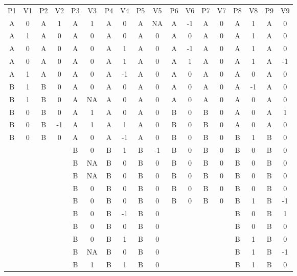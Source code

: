 \documentclass{article}
\begin{document}
\begin{table}

  
\begin{tabular}{c  c  c  c  c  c  c  c  c  c  c  c  c  c  c  c  c  c}

  P1 & V1 & P2 & V2 & P3 & V3 & P4 & V4 & P5 & V5 & P6 & V6 & P7 & V7 & P8 & V8 & P9 & V9\\
A & 0 & A & 1 & A & 1 & A & 0 & A & NA & A & -1 & A & 0 & A & 1 & A & 0\\
A & 1 & A & 0 & A & 0 & A & 0 & A & 0 & A & 0 & A & 0 & A & 1 & A & 0\\
A & 0 & A & 0 & A & 0 & A & 1 & A & 0 & A & -1 & A & 0 & A & 1 & A & 0\\
A & 0 & A & 0 & A & 0 & A & 1 & A & 0 & A & 1 & A & 0 & A & 1 & A & -1\\
A & 1 & A & 0 & A & 0 & A & -1 & A & 0 & A & 0 & A & 0 & A & 0 & A & 0\\
B & 1 & B & 0 & A & 0 & A & 0 & A & 0 & A & 0 & A & 0 & A & -1 & A & 0\\
B & 1 & B & 0 & A & NA & A & 0 & A & 0 & A & 0 & A & 0 & A & 0 & A & 0\\
B & 0 & B & 0 & A & 1 & A & 0 & A & 0 & B & 0 & B & 0 & A & 0 & A & 1\\
B & 0 & B & -1 & A & 1 & A & 1 & A & 0 & B & 0 & B & 0 & A & 0 & A & 0\\
B & 0 & B & 0 & A & 0 & A & -1 & A & 0 & B & 0 & B & 0 & B & 1 & B & 0\\
  &   &   &   & B & 0 & B & 1 & B & -1 & B & 0 & B & 0 & B & 0 & B & 0\\
  &   &   &   & B & NA & B & 0 & B & 0 & B & 0 & B & 0 & B & 0 & B & 0\\
  &   &   &   & B & NA & B & 0 & B & 0 & B & 0 & B & 0 & B & 0 & B & 0\\
  &   &   &   & B & 0 & B & 0 & B & 0 & B & 0 & B & 0 & B & 0 & B & 0\\
  &   &   &   & B & 0 & B & 0 & B & 0 & B & 0 & B & 0 & B & 1 & B & -1\\
  &   &   &   & B & 0 & B & -1 & B & 0 &   &   &   &   & B & 0 & B & 1\\
  &   &   &   & B & 0 & B & 0 & B & 0 &   &   &   &   & B & 0 & B & 0\\
  &   &   &   & B & 0 & B & 1 & B & 0 &   &   &   &   & B & 1 & B & 0\\
  &   &   &   & B & NA & B & 0 & B & 0 &   &   &   &   & B & 1 & B & -1\\
  &   &   &   & B & 1 & B & 1 & B & 0 &   &   &   &   & B & 1 & B & 0\\

\end{tabular}
\end{table}
\end{document}
